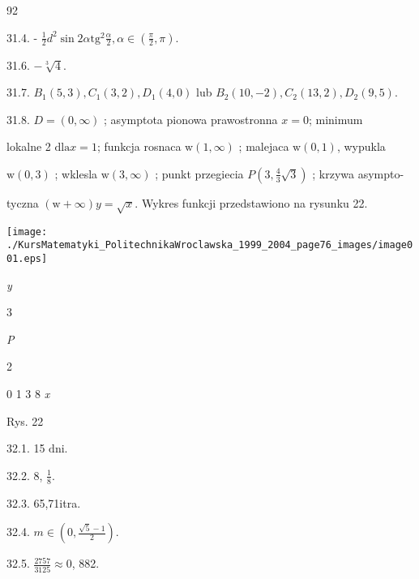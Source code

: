 \documentclass[a4paper,12pt]{article}
\begin{document}
92

31.4. - $\displaystyle \frac{1}{2}d^{2}\sin 2\alpha \mathrm{t}\mathrm{g}^{2}\frac{\alpha}{2}, \alpha\in (\displaystyle \frac{\pi}{2},\pi).$

31.6. $-\sqrt[3]{4}.$

31.7. $B_{1}(5,3), C_{1}(3,2), D_{1}(4,0)$ lub $B_{2}(10,-2), C_{2}(13,2), D_{2}(9,5).$

31.8. $D= (0,\infty)$ ; asymptota pionowa prawostronna $x=0$; minimum

lokalne 2 $\mathrm{d}\mathrm{l}\mathrm{a}x=1$; funkcja rosnaca $\mathrm{w}(1,\infty)$ ; malejaca $\mathrm{w} (0,1)$, wypukla

$\mathrm{w}(0,3)$ ; wklesla $\mathrm{w}(3,\infty)$ ; punkt przegiecia $P(3,\displaystyle \frac{4}{3}\sqrt{3})$ ; krzywa asympto-

tyczna $(\mathrm{w}+\infty) y=\sqrt{x}$. Wykres funkcji przedstawiono na rysunku 22.
\begin{center}
\texttt{[image: ./KursMatematyki\_PolitechnikaWroclawska\_1999\_2004\_page76\_images/image001.eps]}
\end{center}
{\it y}

3

{\it P}

2

0 1  3  8  {\it x}

Rys. 22

32.1. 15 $\mathrm{d}\mathrm{n}\mathrm{i}.$

32.2. 8, $\displaystyle \frac{1}{8}.$

32.3. 65,71itra.

32.4. $ m\in (0,\displaystyle \frac{\sqrt{5}-1}{2}).$

32.5. $\displaystyle \frac{2757}{3125}\approx 0$, 882.
\end{document}
